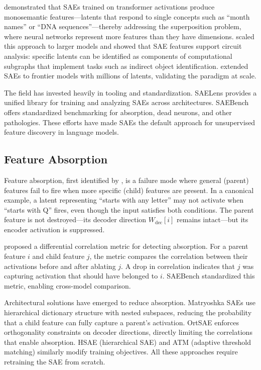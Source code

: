 \documentclass{article}
\begin{document}
\citet{bricken2023towards} demonstrated that SAEs trained on transformer activations produce monosemantic features---latents that respond to single concepts such as ``month names'' or ``DNA sequences''---thereby addressing the superposition problem, where neural networks represent more features than they have dimensions. \citet{cunningham2023sparse} scaled this approach to larger models and showed that SAE features support circuit analysis: specific latents can be identified as components of computational subgraphs that implement tasks such as indirect object identification. \citet{templeton2024scaling} extended SAEs to frontier models with millions of latents, validating the paradigm at scale.

The field has invested heavily in tooling and standardization. SAELens \citep{bloom2024saelens} provides a unified library for training and analyzing SAEs across architectures. SAEBench \citep{karvonen2025saebench} offers standardized benchmarking for absorption, dead neurons, and other pathologies. These efforts have made SAEs the default approach for unsupervised feature discovery in language models.

\subsection{Feature Absorption}
\label{sec:feature-absorption}

Feature absorption, first identified by \citet{chanin2024quantifying}, is a failure mode where general (parent) features fail to fire when more specific (child) features are present. In a canonical example, a latent representing ``starts with any letter'' may not activate when ``starts with Q'' fires, even though the input satisfies both conditions. The parent feature is not destroyed---its decoder direction $W_{\text{dec}}[i]$ remains intact---but its encoder activation is suppressed.

\citet{chanin2024quantifying} proposed a differential correlation metric for detecting absorption. For a parent feature $i$ and child feature $j$, the metric compares the correlation between their activations before and after ablating $j$. A drop in correlation indicates that $j$ was capturing activation that should have belonged to $i$. SAEBench \citep{karvonen2025saebench} standardized this metric, enabling cross-model comparison.

Architectural solutions have emerged to reduce absorption. Matryoshka SAEs \citep{bussmann2025matryoshka} use hierarchical dictionary structure with nested subspaces, reducing the probability that a child feature can fully capture a parent's activation. OrtSAE \citep{korznikov2025ort} enforces orthogonality constraints on decoder directions, directly limiting the correlations that enable absorption. HSAE (hierarchical SAE) and ATM (adaptive threshold matching) similarly modify training objectives. All these approaches require retraining the SAE from scratch.
\end{document}
